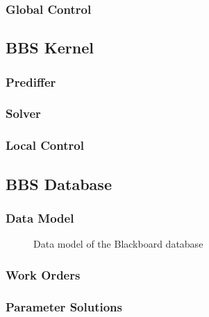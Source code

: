 \documentclass[10pt]{lofar}
\begin{document}
\subsubsection{Global Control}
\label{subsubsec:design-global-control}

\subsection{BBS Kernel}
\label{subsec:design-kernel}

\subsubsection{Prediffer}
\label{subsubsec:design-prediffer}

\subsubsection{Solver}
\label{subsubsec:design-solver}

\subsubsection{Local Control}
\label{subsubsec:design-local-control}

\subsection{BBS Database}
\label{subsec:design-database}

\subsubsection{Data Model}
\label{subsubsec:design-data-model}
\begin{figure}
\caption{Data model of the Blackboard database}
\end{figure}

\subsubsection{Work Orders}
\label{subsubsec:design-work-orders}

\subsubsection{Parameter Solutions}
\label{subsubsec:design-parmsolutions}
\end{document}
